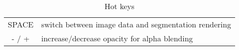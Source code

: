 \documentclass[annual]{acmsiggraph}
\begin{document}
\begin{table}[h]

\begin{tabular}{|c|l|}
\hline
SPACE & switch between image data and segmentation rendering \\ 
- / + & increase/decrease opacity for alpha blending \\ 
\hline
\end{tabular} 
\caption{Hot keys}
\end{table}







\end{document}
